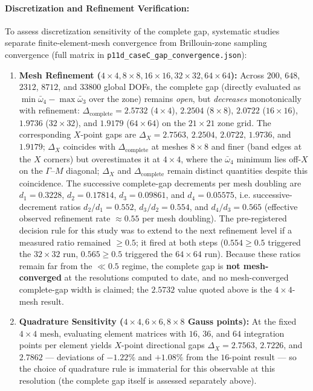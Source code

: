 \paragraph{Discretization and Refinement Verification:} To assess discretization sensitivity of the complete gap, systematic studies separate finite-element-mesh convergence from Brillouin-zone sampling convergence (full matrix in \texttt{p11d\_caseC\_gap\_convergence.json}):
\begin{enumerate}
  \item \textbf{Mesh Refinement ($4\times 4, 8\times 8, 16\times 16, 32\times 32, 64\times 64$):} Across $200$, $648$, $2312$, $8712$, and $33800$ global DOFs, the complete gap (directly evaluated as $\min \bar{\omega}_4 - \max \bar{\omega}_3$ over the zone) remains \emph{open}, but \emph{decreases} monotonically with refinement: $\Delta_{\mathrm{complete}} = 2.5732$ ($4\times 4$), $2.2504$ ($8\times 8$), $2.0722$ ($16\times 16$), $1.9736$ ($32\times 32$), and $1.9179$ ($64\times 64$) on the $21\times 21$ zone grid. The corresponding $X$-point gaps are $\Delta_X = 2.7563$, $2.2504$, $2.0722$, $1.9736$, and $1.9179$; $\Delta_X$ coincides with $\Delta_{\mathrm{complete}}$ at meshes $8\times 8$ and finer (band edges at the $X$ corners) but overestimates it at $4\times 4$, where the $\bar{\omega}_4$ minimum lies off-$X$ on the $\Gamma$--$M$ diagonal; $\Delta_X$ and $\Delta_{\mathrm{complete}}$ remain distinct quantities despite this coincidence. The successive complete-gap decrements per mesh doubling are $d_1 = 0.3228$, $d_2 = 0.17814$, $d_3 = 0.09861$, and $d_4 = 0.05575$, i.e. successive-decrement ratios $d_2/d_1 = 0.552$, $d_3/d_2 = 0.554$, and $d_4/d_3 = 0.565$ (effective observed refinement rate $\approx 0.55$ per mesh doubling). The pre-registered decision rule for this study was to extend to the next refinement level if a measured ratio remained $\ge 0.5$; it fired at both steps ($0.554 \ge 0.5$ triggered the $32\times 32$ run, $0.565 \ge 0.5$ triggered the $64\times 64$ run). Because these ratios remain far from the $\ll 0.5$ regime, the complete gap is \textbf{not mesh-converged} at the resolutions computed to date, and no mesh-converged complete-gap width is claimed; the $2.5732$ value quoted above is the $4\times 4$-mesh result.
  \item \textbf{Quadrature Sensitivity ($4\times 4, 6\times 6, 8\times 8$ Gauss points):} At the fixed $4\times 4$ mesh, evaluating element matrices with $16$, $36$, and $64$ integration points per element yields $X$-point directional gaps $\Delta_X = 2.7563$, $2.7226$, and $2.7862$ --- deviations of $-1.22\%$ and $+1.08\%$ from the $16$-point result --- so the choice of quadrature rule is immaterial for this observable at this resolution (the complete gap itself is assessed separately above).

\end{enumerate}
